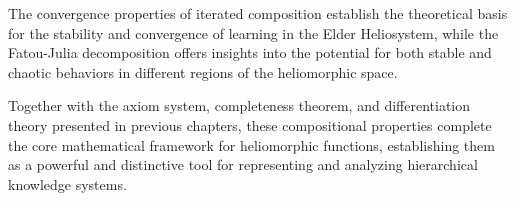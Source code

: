 The convergence properties of iterated composition establish the theoretical basis for the stability and convergence of learning in the Elder Heliosystem, while the Fatou-Julia decomposition offers insights into the potential for both stable and chaotic behaviors in different regions of the heliomorphic space.

Together with the axiom system, completeness theorem, and differentiation theory presented in previous chapters, these compositional properties complete the core mathematical framework for heliomorphic functions, establishing them as a powerful and distinctive tool for representing and analyzing hierarchical knowledge systems.